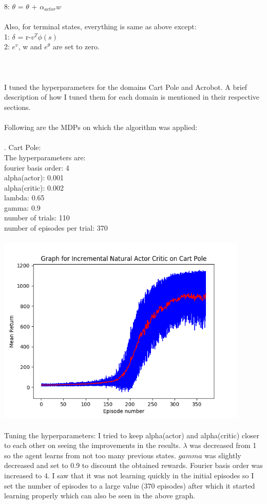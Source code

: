 \documentclass{article}
\begin{document}
8: $\theta$ = $\theta$ + $\alpha_{actor} w $ \\ \\
\noindent Also, for terminal states, everything is same as above except: \\
1: $\delta$ = r-$v^T \phi(s) $ \\
2: $e^v$, w and $e^{\theta}$ are set to zero. \\ \\
 \\ \\
I tuned the hyperparameters for the domains Cart Pole and Acrobot. A brief description of how I tuned them for each domain is mentioned in their respective sections.
\\\\
Following are the MDPs on which the algorithm was applied: 
\\\\
. Cart Pole: \\
The hyperparameters are: \\
fourier basis order: 4 \\
alpha(actor): 0.001 \\
alpha(critic): 0.002 \\
lambda: 0.65 \\
gamma: 0.9 \\
number of trials: 110 \\
number of episodes per trial: 370 \\ \\
\includegraphics[width=12cm]{cartpole} \\ \\
Tuning the hyperparameters: I tried to keep alpha(actor) and alpha(critic) closer to each other on seeing the improvements in the results. $\lambda$ was decreased from 1 so the agent learns from not too many previous states. $gamma$ was slightly decreased and set to 0.9 to discount the obtained rewards. Fourier basis order was increased to 4. I saw that it was not learning quickly in the initial episodes so I set the number of episodes to a large value (370 episodes) after which it started learning properly which can also be seen in the above graph. \\ \\
\end{document}
